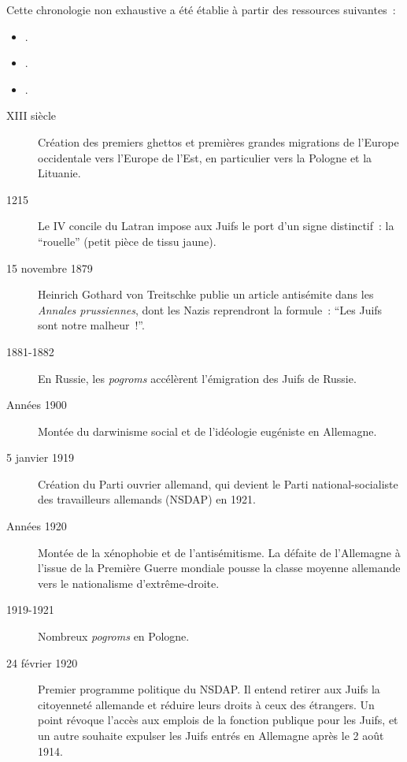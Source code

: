 
Cette chronologie non exhaustive a été établie à partir des ressources suivantes~:
\begin{itemize}
    \item \cite{Bensoussan2020}.
    \item \cite{Bruttmann2020}.
    \item \cite{Memorial}.
\end{itemize}

\bigskip
\bigskip

\begin{description}

    \item[XIII\ieme{} siècle] Création des premiers ghettos et premières grandes migrations de l'Europe occidentale vers l'Europe de l'Est, en particulier vers la Pologne et la Lituanie.
    
    \item[1215] Le IV\ieme{} concile du Latran impose aux Juifs le port d'un signe distinctif~: la \enquote{rouelle} (petit pièce de tissu jaune).
    
    \item[15 novembre 1879] Heinrich Gothard von Treitschke publie un article antisémite dans les \textit{Annales prussiennes}, dont les Nazis reprendront la formule~: \enquote{Les Juifs sont notre malheur~!}.
    
    \item[1881-1882] En Russie, les \textit{pogroms} accélèrent l'émigration des Juifs de Russie.
    
    \item[Années 1900] Montée du darwinisme social et de l'idéologie eugéniste en Allemagne.

    \item[5 janvier 1919] Création du Parti ouvrier allemand, qui devient le Parti national-socialiste des travailleurs allemands (NSDAP) en 1921.
    
    \item[Années 1920] Montée de la xénophobie et de l'antisémitisme. La défaite de l'Allemagne à l'issue de la Première Guerre mondiale pousse la classe moyenne allemande vers le nationalisme d'extrême-droite.
    
    \item[1919-1921] Nombreux \textit{pogroms} en Pologne.
    
    \item[24 février 1920] Premier programme politique du NSDAP. Il entend retirer aux Juifs la citoyenneté allemande et réduire leurs droits à ceux des étrangers. Un point révoque l'accès aux emplois de la fonction publique pour les Juifs, et un autre souhaite expulser les Juifs entrés en Allemagne après le 2 août 1914.
    

\end{description}
